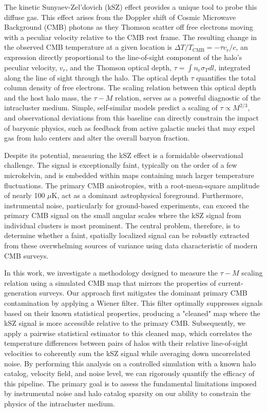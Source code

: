 \documentclass[]{article}
\begin{document}
The kinetic Sunyaev-Zel'dovich (kSZ) effect provides a unique tool to probe this diffuse gas. This effect arises from the Doppler shift of Cosmic Microwave Background (CMB) photons as they Thomson scatter off free electrons moving with a peculiar velocity relative to the CMB rest frame. The resulting change in the observed CMB temperature at a given location is $\Delta T / T_{\text{CMB}} = - \tau v_r / c$, an expression directly proportional to the line-of-sight component of the halo's peculiar velocity, $v_r$, and the Thomson optical depth, $\tau = \int n_e \sigma_T dl$, integrated along the line of sight through the halo. The optical depth $\tau$ quantifies the total column density of free electrons. The scaling relation between this optical depth and the host halo mass, the $\tau-M$ relation, serves as a powerful diagnostic of the intracluster medium. Simple, self-similar models predict a scaling of $\tau \propto M^{2/3}$, and observational deviations from this baseline can directly constrain the impact of baryonic physics, such as feedback from active galactic nuclei that may expel gas from halo centers and alter the overall baryon fraction.

Despite its potential, measuring the kSZ effect is a formidable observational challenge. The signal is exceptionally faint, typically on the order of a few microkelvin, and is embedded within maps containing much larger temperature fluctuations. The primary CMB anisotropies, with a root-mean-square amplitude of nearly 100 $\mu$K, act as a dominant astrophysical foreground. Furthermore, instrumental noise, particularly for ground-based experiments, can exceed the primary CMB signal on the small angular scales where the kSZ signal from individual clusters is most prominent. The central problem, therefore, is to determine whether a faint, spatially localized signal can be robustly extracted from these overwhelming sources of variance using data characteristic of modern CMB surveys.

In this work, we investigate a methodology designed to measure the $\tau-M$ scaling relation using a simulated CMB map that mirrors the properties of current-generation surveys. Our approach first mitigates the dominant primary CMB contamination by applying a Wiener filter. This filter optimally suppresses signals based on their known statistical properties, producing a "cleaned" map where the kSZ signal is more accessible relative to the primary CMB. Subsequently, we apply a pairwise statistical estimator to this cleaned map, which correlates the temperature differences between pairs of halos with their relative line-of-sight velocities to coherently sum the kSZ signal while averaging down uncorrelated noise. By performing this analysis on a controlled simulation with a known halo catalog, velocity field, and noise level, we can rigorously quantify the efficacy of this pipeline. The primary goal is to assess the fundamental limitations imposed by instrumental noise and halo catalog sparsity on our ability to constrain the physics of the intracluster medium.
\end{document}
